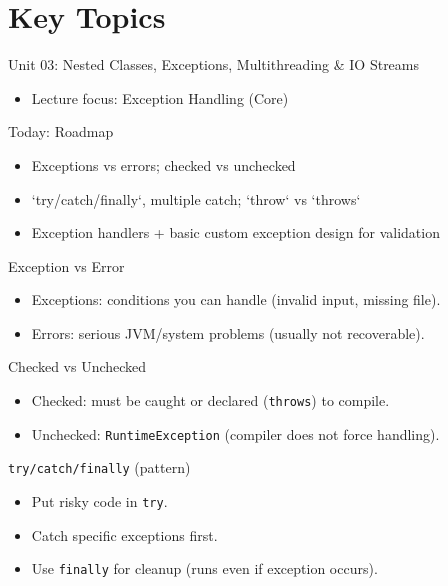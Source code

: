 \documentclass{beamer}
\begin{document}
\section{Key Topics}
\label{sec:concepts}

\begin{frame}{Unit 03: Nested Classes, Exceptions, Multithreading \& IO Streams}
  \begin{itemize}[<+->]
    \item Lecture focus: Exception Handling (Core)
  \end{itemize}
  \slidesources{\OOPSUnitIIISources}
\end{frame}

\begin{frame}{Today: Roadmap}
  \begin{itemize}[<+->]
    \item Exceptions vs errors; checked vs unchecked
    \item `try/catch/finally`, multiple catch; `throw` vs `throws`
    \item Exception handlers + basic custom exception design for validation
  \end{itemize}
  \slidesources{\OOPSUnitIIISources}
\end{frame}

\begin{frame}{Exception vs Error}
  \begin{itemize}[<+->]
    \item Exceptions: conditions you can handle (invalid input, missing file).
    \item Errors: serious JVM/system problems (usually not recoverable).
  \end{itemize}
  \slidesources{\OOPSUnitIIISources}
\end{frame}

\begin{frame}{Checked vs Unchecked}
  \begin{itemize}[<+->]
    \item Checked: must be caught or declared (\texttt{throws}) to compile.
    \item Unchecked: \texttt{RuntimeException} (compiler does not force handling).
  \end{itemize}
  \slidesources{\OOPSUnitIIISources}
\end{frame}

\begin{frame}{\texttt{try/catch/finally} (pattern)}
  \begin{itemize}[<+->]
    \item Put risky code in \texttt{try}.
    \item Catch specific exceptions first.
    \item Use \texttt{finally} for cleanup (runs even if exception occurs).
  \end{itemize}
  \slidesources{\OOPSUnitIIISources}
\end{frame}
\end{document}
